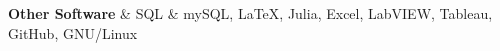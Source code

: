 \textbf{Other Software} & 
SQL \& mySQL, 
\LaTeX, 
Julia, 
Excel, 
LabVIEW, 
Tableau, 
GitHub, 
GNU/Linux 